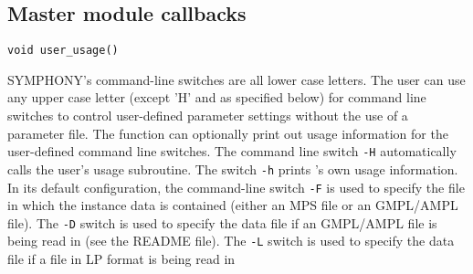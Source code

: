 

\subsection{Master module callbacks}

\bd


\label{user_usage}
\begin{verbatim}
void user_usage()
\end{verbatim}

\bd

\describe

SYMPHONY's command-line switches are all lower case letters. The user can use
any upper case letter (except 'H' and as specified below) for command line
switches to control user-defined parameter settings without the use of a
parameter file. The function  can optionally print out
usage information for the user-defined command line switches. The command line
switch {\tt -H} automatically calls the user's usage subroutine. The switch
{\tt -h} prints \BB's own usage information. In its default configuration, the
command-line switch \texttt{-F} is used to specify the file in which the
instance data is contained (either an MPS file or an GMPL/AMPL file). The
\texttt{-D} switch is used to specify the data file if an GMPL/AMPL file is
being read in (see the README file). The \texttt{-L} switch is used to specify
the data file if a file in LP format is being read in

